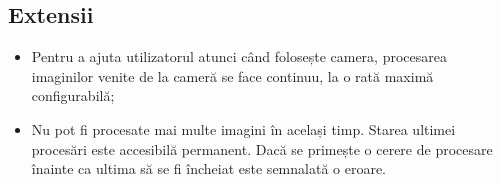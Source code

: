 \subsection*{Extensii}\label{extensii}

\begin{itemize}
\item
  Pentru a ajuta utilizatorul atunci când folosește camera, procesarea
  imaginilor venite de la cameră se face continuu, la o rată maximă
  configurabilă;
\item
  Nu pot fi procesate mai multe imagini în același timp. Starea ultimei
  procesări este accesibilă permanent. Dacă se primește o cerere de
  procesare înainte ca ultima să se fi încheiat este semnalată o eroare.
\end{itemize}
